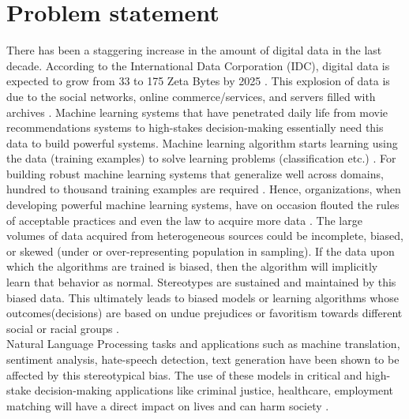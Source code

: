 \section{Problem statement}
There has been a staggering increase in the amount of digital data in the last decade. According to the International Data Corporation (IDC), digital data is expected to grow from 33 to 175 Zeta Bytes by 2025 \cite{IDC}. This explosion of data is due to the social networks, online commerce/services, and servers filled with archives \cite{IDC}. Machine learning systems that have penetrated daily life from movie recommendations systems to high-stakes decision-making essentially need this data to build powerful systems. Machine learning algorithm starts learning using the data (training examples) to solve learning problems (classification etc.) \cite{jordan2015machine}. For building robust machine learning systems that generalize well across domains, hundred to thousand training examples are required \cite{radford2019language}. Hence, organizations, when developing powerful machine learning systems, have on occasion flouted the rules of acceptable practices and even the law to acquire more data \cite{lloyd2018bias}. The large volumes of data acquired from heterogeneous sources could be incomplete, biased, or skewed (under or over-representing population in sampling)\cite{campolo2017ai}. If the data upon which the algorithms are trained is biased, then the algorithm will implicitly learn that behavior as normal\cite{lloyd2018bias}. Stereotypes are sustained and maintained by this biased data. This ultimately leads to biased models or learning algorithms whose outcomes(decisions) are based on undue prejudices or favoritism towards different social or racial groups \cite{mehrabi2019survey}. 
\\
Natural Language Processing tasks and applications such as machine translation, sentiment analysis, hate-speech detection, text generation \cite{blodgett2020language} have been shown to be affected by this stereotypical bias. The use of these models in critical and high-stake decision-making applications like criminal justice, healthcare, employment matching will have a direct impact on lives and can harm society \cite{mehrabi2019survey}.
\\
